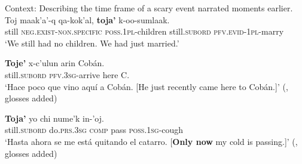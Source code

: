 \begin{exe}
	\ex\label{exAppendixKekchiSequencing5}
	Context: Describing the time frame of a scary event narrated moments earlier.\\
	\gll Toj maak'a'-q qa-kok'al, \textbf{toja'} k-oo-sumlaak.\\
	still \textsc{neg}.\textsc{exist}-\textsc{non}.\textsc{specific} \textsc{poss}.1\textsc{pl-}children still.\textsc{subord} \textsc{pfv}.\textsc{evid}-1\textsc{pl}-marry\\
	\glt \lq We still had no children. We had just married.\rq{ }\parencite[468]{Kockelman2020}

	\ex\label{exAppendixKekchiSequencing6}
	\gll \textbf{Toje'} x-c’ulun arin Cobán.\\
	still.\textsc{subord} \textsc{pfv}.3\textsc{sg}-arrive here C.\\
	\glt \lq Hace poco que vino aquí a Cobán. [He just recently came here to Cobán.]' (\cite[202]{EachusCarlson1980}, glosses added)
	
	\ex\label{exAppendixKekchiOnlyNow}
		\gll \textbf{Toja\rq} yo chi nume\rq{}k in-\rq{}oj.\\
	still.\textsc{subord} do.\textsc{prs}.3\textsc{sg} \textsc{comp} pass \textsc{poss}.1\textsc{sg}-cough\\
	\glt \lq Hasta ahora se me está quitando el catarro. [\textbf{Only now} my cold is passing.]\rq{ }(\cite[231]{SamJuarezEtAl2003}, glosses added)
\end{exe}

\pagebreak
\largerpage
